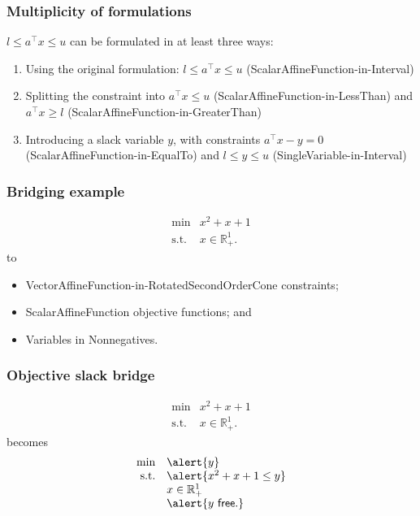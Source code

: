 \documentclass{beamer}
\begin{document}
\begin{frame}
  \frametitle{Multiplicity of formulations}
$l \le a^\top x \le u$ can be formulated in at least three ways:
\begin{enumerate}
    \item Using the original formulation: $l \le a^\top x \le u$ (\textsf{ScalarAffineFunction}-in-\textsf{Interval})\pause
    \item Splitting the constraint into $a^\top x \le u$ (\textsf{ScalarAffineFunction}-in-\textsf{LessThan}) and $a^\top x \ge l$ (\textsf{ScalarAffineFunction}-in-\textsf{GreaterThan})\pause
    \item Introducing a slack variable $y$, with constraints $a^\top x - y = 0$ (\textsf{ScalarAffineFunction}-in-\textsf{EqualTo}) and $l \le y \le u$ (\textsf{SingleVariable}-in-\textsf{Interval})
\end{enumerate}
\end{frame}

\begin{frame}
  \frametitle{Bridging example}
\begin{equation*}
    \begin{array}{rl}
        \min & x^2 + x + 1\\
        \text{s.t.} & x \in \mathbb{R}^1_+.
    \end{array}
\end{equation*}
to
\begin{itemize}
    \item \textsf{VectorAffineFunction}-in-\textsf{RotatedSecondOrderCone} constraints;
    \item \textsf{ScalarAffineFunction} objective functions; and
    \item Variables in \textsf{Nonnegatives}.
\end{itemize}
\end{frame}

\begin{frame}
  \frametitle{Objective slack bridge}
\begin{equation*}
    \begin{array}{rl}
        \min & x^2 + x + 1\\
        \text{s.t.} & x \in \mathbb{R}^1_+.
    \end{array}
\end{equation*}
becomes
\begin{equation*}
    \begin{array}{rl}
        \min & \alert{y}\\
        \text{s.t.} & \alert{x^2 + x + 1 \le y}\\
        & x \in \mathbb{R}^1_+\\
        & \alert{y\ \mathsf{free}.}
    \end{array}
\end{equation*}
\end{frame}
\end{document}
